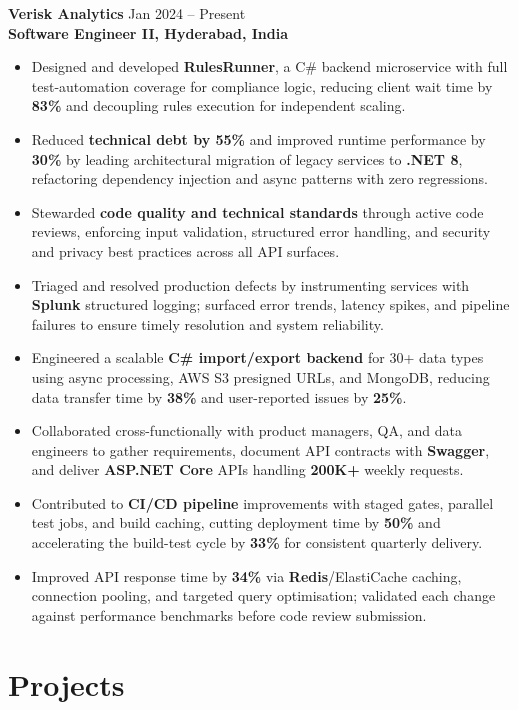 \documentclass[letterpaper,10pt]{article}
\begin{document}
\textbf{Verisk Analytics} \hfill Jan 2024 -- Present \\
\textbf{Software Engineer II, Hyderabad, India}
\begin{itemize}[leftmargin=*]
    \item Designed and developed \textbf{RulesRunner}, a C\# backend microservice with full test-automation coverage for compliance logic, reducing client wait time by \textbf{83\%} and decoupling rules execution for independent scaling.
    \item Reduced \textbf{technical debt by 55\%} and improved runtime performance by \textbf{30\%} by leading architectural migration of legacy services to \textbf{.NET 8}, refactoring dependency injection and async patterns with zero regressions.
    \item Stewarded \textbf{code quality and technical standards} through active code reviews, enforcing input validation, structured error handling, and security and privacy best practices across all API surfaces.
    \item Triaged and resolved production defects by instrumenting services with \textbf{Splunk} structured logging; surfaced error trends, latency spikes, and pipeline failures to ensure timely resolution and system reliability.
    \item Engineered a scalable \textbf{C\# import/export backend} for 30+ data types using async processing, AWS S3 presigned URLs, and MongoDB, reducing data transfer time by \textbf{38\%} and user-reported issues by \textbf{25\%}.
    \item Collaborated cross-functionally with product managers, QA, and data engineers to gather requirements, document API contracts with \textbf{Swagger}, and deliver \textbf{ASP.NET Core} APIs handling \textbf{200K+} weekly requests.
    \item Contributed to \textbf{CI/CD pipeline} improvements with staged gates, parallel test jobs, and build caching, cutting deployment time by \textbf{50\%} and accelerating the build-test cycle by \textbf{33\%} for consistent quarterly delivery.
    \item Improved API response time by \textbf{34\%} via \textbf{Redis}/ElastiCache caching, connection pooling, and targeted query optimisation; validated each change against performance benchmarks before code review submission.
\end{itemize}

\section*{Projects}
\end{document}
